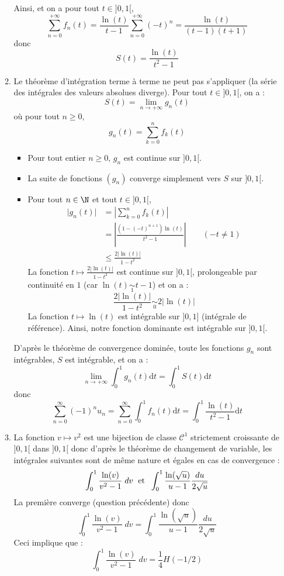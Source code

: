 \documentclass[twoside,french,11pt]{VcCours}
\newcommand{\enc}[1]{\fbox{#1}}
\newcommand{\dt}{\text{d}t}
\begin{document}
\begin{enumerate}
\begin{enumerate}
  Ainsi, \enc{$\sum f_n$ converge simplement sur $]0,1[$}
  et on a pour tout $t \in ]0,1[$,
  $$ \sum_{n=0}^{+ \infty} f_n(t) =  \dfrac{\ln(t)}{t-1} \sum_{n=0}^{+ \infty} (-t)^n = \dfrac{\ln(t)}{(t-1)(t+1)}$$
  donc
  $$ \boxed{S(t) = \dfrac{\ln(t)}{t^2-1}}$$
  \item Le théorème d'intégration terme à terme ne peut pas s'appliquer (la série des intégrales des valeurs absolues diverge). Pour tout $t \in ]0,1[$, on a :
  $$ S(t) = \lim_{n \rightarrow + \infty} g_n(t)$$
  où pour tout $n \geq 0$,
  $$g_n(t) = \sum_{k=0}^n f_k(t)$$
  \begin{itemize}
  \item Pour tout entier $n \geq 0$, $g_n$ est continue sur $]0,1[$.
  \item La suite de fonctions $(g_n)$ converge simplement vers $S$ sur $]0,1[$.
  \item Pour tout $n\in \N$ et tout $t\in ]0,1[$,
  \begin{align*}
  \vert g_n(t) \vert & =  \left |\sum_{k=0}^nf_k(t)\right | \\
  & =\left |\frac{(1-(-t)^{n+1})\ln(t)}{t^2-1}\right | \qquad (-t \neq 1) \\
  & \leq \frac{2|\ln(t)|}{1-t^2}
  \end{align*}
  La fonction $t \mapsto  \frac{2|\ln(t)|}{1-t^2}$ est continue sur $]0,1[$, prolongeable par continuité en $1$ (car $\ln(t) \underset{1}{\sim} t-1$) et on a :
  $$  \frac{2|\ln(t)|}{1-t^2} \underset{0}{\sim} 2 \vert \ln(t) \vert$$
  La fonction $t \mapsto \ln(t)$ est intégrable sur $]0,1]$ (intégrale de référence). Ainsi, notre fonction dominante est intégrable sur $]0,1[$.
  \end{itemize}
  D'après le théorème de convergence dominée, toute les fonctions $g_n$ sont intégrables, $S$ est intégrable, et on a :
  $$ \lim_{n \rightarrow + \infty} \int_0^1 g_n(t) \dt = \int_0^1 S(t) \dt $$
  donc
  $$ \boxed{\sum_{n=0}^\infty (-1)^nu_n=\sum_{n=0}^\infty\int_0^1f_n(t) \dt =\int_0^1\frac{\ln(t)}{t^2-1}\dt}$$
  \item La fonction $v\mapsto v^2$ est une bijection de classe $\mathcal{C}^1$  strictement croissante de $]0,1[$ dans $]0,1[$ donc d'après le théorème de changement de variable, les intégrales suivantes sont de même nature et égales en cas de convergence :
  $$ \int_0^1\frac{\ln(v)}{v^2-1} \; dv \; \hbox{ et } \; \int_0^1\frac{\ln(\sqrt{u})}{u-1}\frac{du}{2\sqrt{u}}$$
  La première converge (question précédente) donc 
  $$\int_0^1\frac{\ln(v)}{v^2-1}\;dv=\int_0^1\frac{\ln(\sqrt{u})}{u-1}\frac{du}{2\sqrt{u}} $$
  Ceci implique que :
  $$ \boxed{\int_0^1\frac{\ln(v)}{v^2-1}\;dv = \frac{1}{4}H(-1/2)}$$
  
  \end{enumerate}
  \end{enumerate}
  
\end{document}
